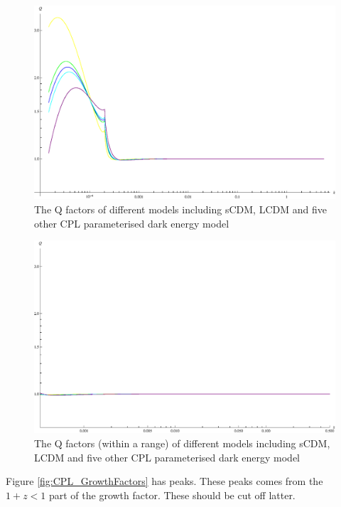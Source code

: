 \documentclass{article}
\begin{document}
\begin{figure}[!htbp]
\centering
\includegraphics[width=400pt]{CPL_QFactors.eps}
\caption{The Q factors of different models including sCDM, LCDM and five other CPL parameterised dark energy model}\label{fig:CPL_QFactors}
\end{figure}





\begin{figure}[!htbp]
\centering
\includegraphics[width=400pt]{CPL_QFactors_Cut.eps}
\caption{The Q factors (within a range) of different models including sCDM, LCDM and five other CPL parameterised dark energy model}\label{fig:CPL_QFactors_Cut}
\end{figure}

Figure \ref{fig:CPL_GrowthFactors} has peaks. These peaks comes from the $1+z<1$ part of the growth factor. These should be cut off latter.
\end{document}
